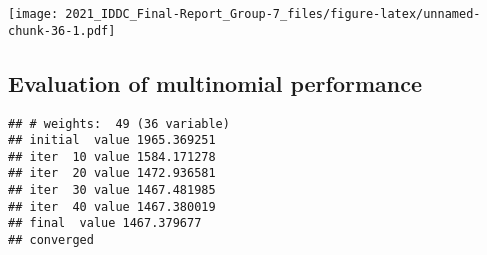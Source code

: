 \documentclass[
]{article}
\newenvironment{Shaded}{\begin{snugshade}}{\end{snugshade}}
\newcommand{\CommentTok}[1]{\textcolor[rgb]{0.56,0.35,0.01}{\textit{#1}}}
\newcommand{\DataTypeTok}[1]{\textcolor[rgb]{0.13,0.29,0.53}{#1}}
\newcommand{\DecValTok}[1]{\textcolor[rgb]{0.00,0.00,0.81}{#1}}
\newcommand{\KeywordTok}[1]{\textcolor[rgb]{0.13,0.29,0.53}{\textbf{#1}}}
\newcommand{\NormalTok}[1]{#1}
\newcommand{\OperatorTok}[1]{\textcolor[rgb]{0.81,0.36,0.00}{\textbf{#1}}}
\newcommand{\StringTok}[1]{\textcolor[rgb]{0.31,0.60,0.02}{#1}}
\begin{document}
\texttt{[image: 2021\_IDDC\_Final-Report\_Group-7\_files/figure-latex/unnamed-chunk-36-1.pdf]}

\hypertarget{evaluation-of-multinomial-performance}{%
\subsection{Evaluation of multinomial
performance}\label{evaluation-of-multinomial-performance}}

\begin{Shaded}
\end{Shaded}

\begin{verbatim}
## # weights:  49 (36 variable)
## initial  value 1965.369251 
## iter  10 value 1584.171278
## iter  20 value 1472.936581
## iter  30 value 1467.481985
## iter  40 value 1467.380019
## final  value 1467.379677 
## converged
\end{verbatim}
\end{document}
